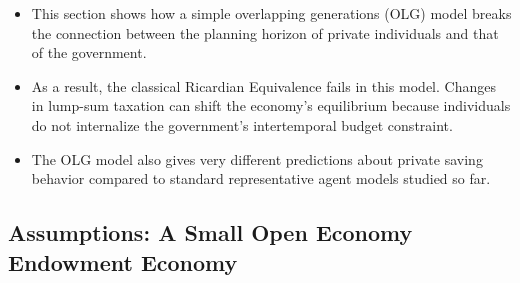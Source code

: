 \documentclass[12pt]{article}
\begin{document}
\begin{itemize}
\item This section shows how a simple overlapping generations (OLG) model breaks the connection between the planning horizon of private individuals and that of the government.

\item As a result, the classical Ricardian Equivalence fails in this model. Changes in lump-sum taxation can shift the economy’s equilibrium because individuals do not internalize the government’s intertemporal budget constraint.

\item The OLG model also gives very different predictions about private saving behavior compared to standard representative agent models studied so far.
\end{itemize}

\subsection*{\noindent\textbf{Assumptions: A Small Open Economy Endowment Economy}}
\end{document}
